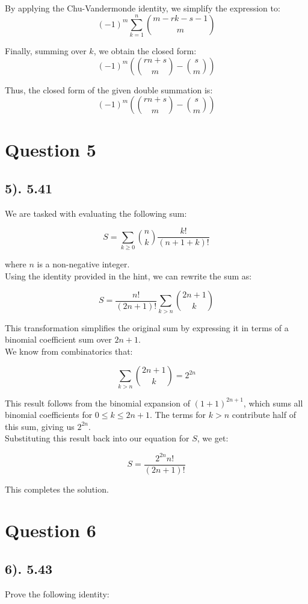 \documentclass[12pt]{article}
\begin{document}
By applying the Chu-Vandermonde identity, we simplify the expression to:
\[
(-1)^m \sum_{k=1}^{n} \binom{m - rk - s - 1}{m}
\]

Finally, summing over \( k \), we obtain the closed form:
\[
(-1)^m \left( \binom{rn + s}{m} - \binom{s}{m} \right)
\]

Thus, the closed form of the given double summation is:
\[
(-1)^m \left( \binom{rn + s}{m} - \binom{s}{m} \right)
\]

\section*{Question 5}
\subsection*{5). 5.41}
We are tasked with evaluating the following sum:

\[
S = \sum_{k \geq 0} \binom{n}{k} \frac{k!}{(n+1+k)!}
\]

where \(n\) is a non-negative integer.\\

Using the identity provided in the hint, we can rewrite the sum as:

\[
S = \frac{n!}{(2n+1)!} \sum_{k > n} \binom{2n+1}{k}
\]

This transformation simplifies the original sum by expressing it in terms of a binomial coefficient sum over \(2n+1\).\\

We know from combinatorics that:

\[
\sum_{k > n} \binom{2n+1}{k} = 2^{2n}
\]

This result follows from the binomial expansion of \( (1 + 1)^{2n+1} \), which sums all binomial coefficients for \( 0 \leq k \leq 2n+1 \). The terms for \( k > n \) contribute half of this sum, giving us \( 2^{2n} \).\\

Substituting this result back into our equation for \( S \), we get:

\[
S = \frac{2^{2n} n!}{(2n+1)!}
\]

This completes the solution.

\section*{Question 6}
\subsection*{6). 5.43}
Prove the following identity:
\end{document}
